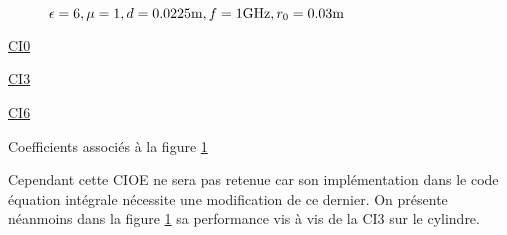     \begin{figure}[!hbt]
      \centering
      
      \caption[CIOE sur empilement de Hoppe & Rahmat-Samii p.~62]{\(\epsilon = 6, \mu = 1, d=0.0225\text{m}, f=1\text{GHz}, r_0=0.03\text{m}\)}
      \label{fig:imp_fourier:plan:hoppe:62:hoibc:ibc6}
    \end{figure}
    \begin{table}[!hbt]
      \centering
      \begin{minipage}[t]{0.49\textwidth}
        \vspace{0pt}
        \centering
        \begin{coefftable}{\hyperlink{ci0}{CI0}}
          
        \end{coefftable}
        \begin{coefftable}{\hyperlink{ci3}{CI3}}
          
        \end{coefftable}
      \end{minipage}
      \begin{minipage}[t]{0.49\textwidth}
        \vspace{0pt}
        \centering
        \begin{coefftable}{\hyperlink{ci6}{CI6}}
          
        \end{coefftable}
      \end{minipage}
      \caption{Coefficients associés à la figure \ref{fig:imp_fourier:plan:hoppe:62:hoibc:ibc6}}
      \label{tab:imp_fourier:plan:hoppe:62:hoibc:ibc6}
    \end{table}

    Cependant cette CIOE ne sera pas retenue car son implémentation dans le code équation intégrale nécessite une modification de ce dernier. On présente néanmoins dans la figure \ref{fig:imp_fourier:plan:hoppe:62:hoibc:ibc6} sa performance vis à vis de la CI3 sur le cylindre.
